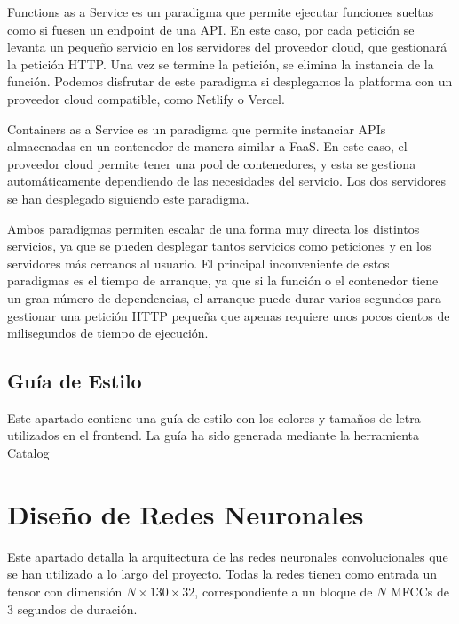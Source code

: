 Functions as a Service es un paradigma que permite ejecutar funciones sueltas como si fuesen un endpoint de una API. En este caso, por cada petición se levanta un pequeño servicio en los servidores del proveedor cloud, que gestionará la petición HTTP. Una vez se termine la petición, se elimina la instancia de la función.
Podemos disfrutar de este paradigma si desplegamos la platforma con un proveedor cloud compatible, como Netlify o Vercel. 

Containers as a Service es un paradigma que permite instanciar APIs almacenadas en un contenedor de manera similar a FaaS. En este caso, el proveedor cloud permite tener una pool de contenedores, y esta se gestiona automáticamente dependiendo de las necesidades del servicio.
Los dos servidores se han desplegado siguiendo este paradigma. 

Ambos paradigmas permiten escalar de una forma muy directa los distintos servicios, ya que se pueden desplegar tantos servicios como peticiones y en los servidores más cercanos al usuario. El principal inconveniente de estos paradigmas es el tiempo de arranque, ya que si la función o el contenedor tiene un gran número de dependencias, el arranque puede durar varios segundos para gestionar una petición HTTP pequeña que apenas requiere unos pocos cientos de milisegundos de tiempo de ejecución.


\subsection{Guía de Estilo}
Este apartado contiene una guía de estilo con los colores y tamaños de letra utilizados en el frontend. La guía ha sido generada mediante la herramienta Catalog \cite{Catalog1:online}

\label{anexo:guia_estilo}

\clearpage
\section{Diseño de Redes Neuronales}

Este apartado detalla la arquitectura de las redes neuronales convolucionales que se han utilizado a lo largo del proyecto. Todas la redes tienen como entrada un tensor con dimensión $N\times130\times32$, correspondiente a un bloque de $N$ MFCCs de 3 segundos de duración.

